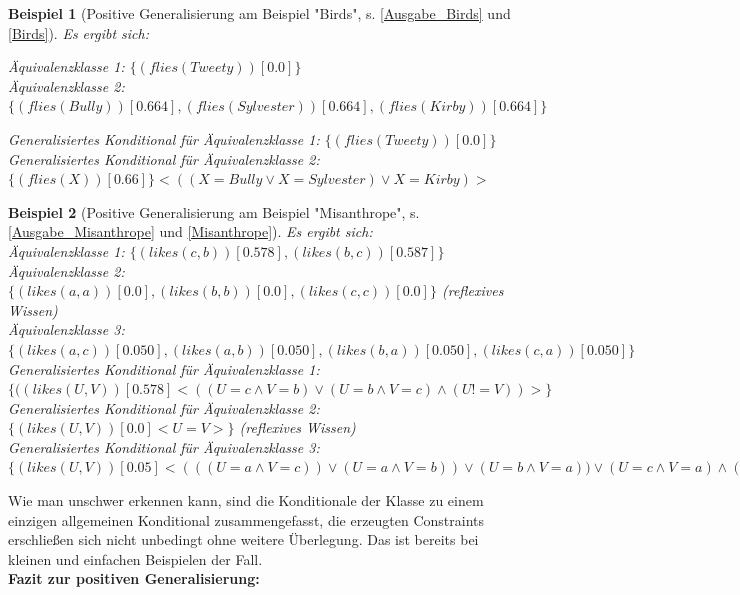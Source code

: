 \documentclass[a4paper, 11pt]{book}
\newtheorem{Bsp}{Beispiel}[section]
\begin{document}
\begin{Bsp}[Positive Generalisierung am Beispiel "{}Birds"{}, s. \ref{Ausgabe_Birds} und \ref{Birds}] 
	Es ergibt sich:
	
	\noindent
	Äquivalenzklasse 1: $\{(flies(Tweety))[0.0]\}$\\
	Äquivalenzklasse 2: $\{(flies(Bully))[0.664], (flies(Sylvester))[0.664], (flies(Kirby))[0.664]\}$
	
	\noindent
	Generalisiertes Konditional für Äquivalenzklasse 1: $\{(flies(Tweety))[0.0]\}$\\
	Generalisiertes Konditional für Äquivalenzklasse 2: $\{(flies(X))[0.66]\} <((X=Bully \lor X=Sylvester) \lor X=Kirby)>$
\end{Bsp}
\begin{Bsp}[Positive Generalisierung am Beispiel "{}Misanthrope"{}, s. \ref{Ausgabe_Misanthrope} und \ref{Misanthrope}]
	Es ergibt sich:\\
	
	\noindent
	Äquivalenzklasse 1: $ \{(likes(c,b))[0.578], (likes(b,c))[0.587]\} $\\
	Äquivalenzklasse 2: $ \{(likes(a,a))[0.0], (likes(b,b))[0.0], (likes(c,c))[0.0]\} $ (reflexives Wissen)\\
	Äquivalenzklasse 3: $ \{(likes(a,c))[0.050], (likes(a,b))[0.050], (likes(b,a))[0.050], (likes(c,a))[0.050]\} $\\

	\noindent
	Generalisiertes Konditional für Äquivalenzklasse 1: $ \{((likes(U,V))[0.578] <((U=c \land V=b) \lor (U=b \land V=c) \land (U!=V))>\} $\\
	Generalisiertes Konditional für Äquivalenzklasse 2: $ \{(likes(U,V))[0.0] <U=V>\} $ (reflexives Wissen)\\
	Generalisiertes Konditional für Äquivalenzklasse 3: $ \{(likes(U,V))[0.05] <((( U=a \land V=c)) \lor (U=a \land V=b)) \lor (U=b \land V=a)) \lor (U=c \land V=a) \land (U!=V))>\} $\\
\end{Bsp}
Wie man unschwer erkennen kann, sind die Konditionale der Klasse zu einem einzigen allgemeinen Konditional zusammengefasst, die erzeugten Constraints erschließen sich nicht unbedingt ohne weitere Überlegung. Das ist bereits bei kleinen und einfachen Beispielen der Fall.
\\


\textbf{{\large Fazit zur positiven Generalisierung:}}\label{Fazit pos Gen} 
\end{document}
